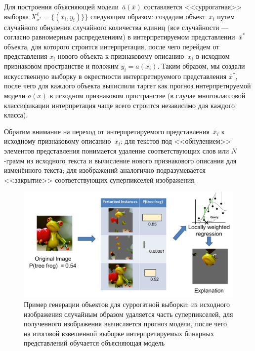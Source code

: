 \documentclass[12pt,a4paper]{article}
\begin{document}
	\par Для построения объясняющей модели~$\bar{a}(\bar{x})$ составляется <<суррогатная>> выборка $X_{x^*}^\ell = \{ (\bar{x}_i, y_i) \}\}$ следующим образом: создадим объект~$\bar{x}_i$ путем случайного обнуления случайного количества единиц (все случайности — согласно равномерным распределениям) в интерпретируемом представлении~$\bar{x}^*$ объекта, для которого строится интерпретация, после чего перейдем от представления $\bar{x}_i$ нового объекта к признаковому описанию~$x_i$ в исходном признаковом пространстве и положим $y_i = a(x_i)$. Таким образом, мы создали искусственную выборку в окрестности интерпретируемого представления $\bar{x}^*$, после чего для каждого объекта вычислили таргет как прогноз интерпретируемой модели $a(x)$ в исходном признаковом пространстве (в случае многоклассовой классификации интерпретация чаще всего строится независимо для каждого класса).
	\par Обратим внимание на переход от интерпретируемого представления~$\bar{x}_i$ к исходному признаковому описанию~$x_i$: для текстов под <<обнулением>> элементов представления понимается удаление соответствующих слов или $N$-грамм из исходного текста и вычисление нового признакового описания для изменённого текста; для изображений аналогично подразумевается <<закрытие>> соответствующих суперпикселей изображения.
	
	\begin{center}
		\begin{figure}[!htb]
			\centering
			\includegraphics[width=0.9\linewidth]{lime_sample.jpg}
			\caption{Пример генерации объектов для суррогатной выборки: из исходного изображения случайным образом удаляется часть суперпикселей, для полученного изображения вычисляется прогноз модели, после чего на итоговой взвешенной выборке интерпретируемых бинарных представлений обучается объясняющая модель}
		\end{figure}
	\end{center}
	
\end{document}
